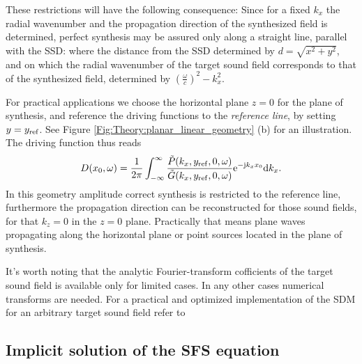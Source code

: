 These restrictions will have the following consequence:
Since for a fixed $k_x$ the radial wavenumber and the propagation direction of the synthesized field is determined, perfect synthesis may be assured only along a straight line, parallel with the SSD: where the distance from the SSD determined by $d = \sqrt{x^2 + y^2}$, and on which the radial wavenumber of the target sound field corresponds to that of the synthesized field, determined by $\left( \frac{\omega} {c}\right)^2 - k_x^2$.

For practical applications we choose the horizontal plane $z=0$ for the plane of synthesis, and reference the driving functions to the \emph{reference line}, by setting $y = y_{\mathrm{ref}}$.
See Figure \ref{Fig:Theory:planar_linear_geometry} (b) for an illustration. The driving function thus reads
\begin{equation}
D(x_0,\omega) = \frac{1}{2\pi} \int_{-\infty}^{\infty} \frac{\tilde{P}(k_x,y_{\mathrm{ref}},0, \omega) }{\tilde{G}(k_x,y_{\mathrm{ref}},0, \omega)} \mathrm{e}^{-\mathrm{j} k_x x_0} \mathrm{d} k_x.
\label{Eq:Theory:Linear_SDM}
\end{equation}
In this geometry amplitude correct synthesis is restricted to the reference line, furthermore the propagation direction can be reconstructed for those sound fields, for that $k_z = 0$ in the $z=0$ plane. Practically that means plane waves propagating along the horizontal plane or point sources located in the plane of synthesis.

\vspace{3mm}
It's worth noting that the analytic Fourier-transform cofficients of the target sound field is available only for limited cases. In any other cases numerical transforms are needed.
For a practical and optimized implementation of the SDM for an arbitrary target sound field refer to \cite{ahrens2013a:efficientSDM}

%


\newpage
\subsection{Implicit solution of the SFS equation}

